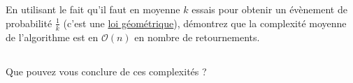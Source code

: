 \documentclass
[12pt]
{article}
\begin{document}
\subsection{}

En utilisant le fait qu'il faut en moyenne $k$ essais pour obtenir un évènement de probabilité $\frac{1}{k}$ (c'est une \href{https://fr.wikipedia.org/wiki/Loi_g%C3%A9om%C3%A9trique}{loi géométrique}), démontrez que la complexité moyenne de l'algorithme est en $\mathcal{O}(n)$ en nombre de retournements.

\subsection{}

Que pouvez vous conclure de ces complexités ?
\end{document}
